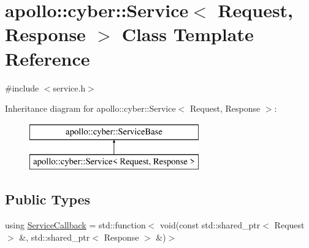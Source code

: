 \hypertarget{classapollo_1_1cyber_1_1Service}{\section{apollo\-:\-:cyber\-:\-:Service$<$ Request, Response $>$ Class Template Reference}
\label{classapollo_1_1cyber_1_1Service}
}


{\ttfamily \#include $<$service.\-h$>$}

Inheritance diagram for apollo\-:\-:cyber\-:\-:Service$<$ Request, Response $>$\-:\begin{figure}[H]
\begin{center}
\leavevmode
\includegraphics[height=2.000000cm]{classapollo_1_1cyber_1_1Service}
\end{center}
\end{figure}
\subsection*{Public Types}
\begin{DoxyCompactItemize}
\item 
using \hyperlink{classapollo_1_1cyber_1_1Service_aedd53fb1d4b3636253ddcaba4dc896ab}{Service\-Callback} = std\-::function$<$ void(const std\-::shared\-\_\-ptr$<$ Request $>$ \&, std\-::shared\-\_\-ptr$<$ Response $>$ \&)$>$
\end{DoxyCompactItemize}
